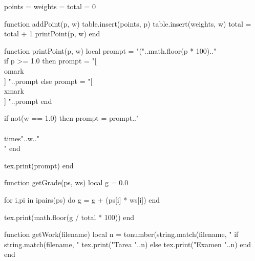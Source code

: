 \usepackage[a4paper, top=2cm]{geometry}
\usepackage[spanish,mexico]{babel}
\usepackage[dvipsnames]{xcolor}
\usepackage{xfp}
\usepackage{pifont}
\usepackage{luacode}
\usepackage{pdfpages}
\usepackage{amsmath,enumerate}


\newcommand{\omark}{{\color{OliveGreen}\ding{52}}}
\newcommand{\xmark}{{\color{Bittersweet}\ding{56}}}
\newcommand{\point}[2][1.0]{\item\textbf{\directlua{addPoint(#2, #1)}} }
\newcommand{\grade}{\directlua{getGrade(points, weights)} }
\newcommand{\work}{\directlua{getWork(\luastring\jobname)} }
\newcommand{\fullname}{\directlua{getFullname(\luastring\jobname)} }
\newcommand{\appendhw}{\directlua{getHWfile(\luastring\jobname)}}

\begin{luacode*}

    points = {}
    weights = {}
    total = 0

    function addPoint(p, w)
        table.insert(points, p)
        table.insert(weights, w)
        total = total + 1
        printPoint(p, w)
    end

    function printPoint(p, w)
        local prompt = "("..math.floor(p * 100).."\\%

        if p >= 1.0 then
            prompt = "[ \\omark \\ ] "..prompt
        else
            prompt = "[ \\xmark \\ ] "..prompt
        end

        if not(w == 1.0) then
            prompt = prompt.." \\{\\times"..w.."\\}"
        end

        tex.print(prompt)
    end

    function getGrade(ps, ws)
        local g = 0.0

        for i,pi in ipairs(ps) do
            g = g + (ps[i] * ws[i])
        end

        tex.print(math.floor(g / total * 100))
    end

    function getWork(filename)
        local n = tonumber(string.match(filename, "%
        if string.match(filename, "%
            tex.print("Tarea "..n)
        else
            tex.print("Examen "..n)
        end
    end


\end{luacode*}
